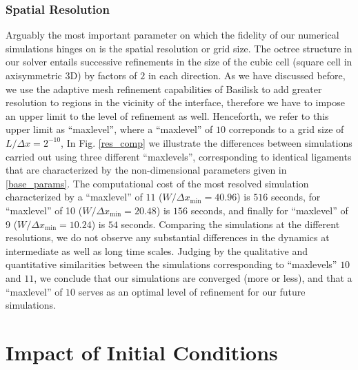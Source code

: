 \subsubsection*{Spatial Resolution}

Arguably the most important parameter on which the fidelity of our
numerical simulations hinges on is the spatial resolution or grid size. 
The octree structure in our solver entails successive refinements in the  
size of the cubic cell (square cell in axisymmetric 3D) by factors of $2$ in each direction.
As we have discussed before, we use the adaptive mesh refinement capabilities 
of Basilisk to add greater resolution to regions in the vicinity of the interface, 
therefore we have to impose an upper limit to the level of refinement as well. 
Henceforth, we refer to this upper limit as ``maxlevel'', 
where a ``maxlevel'' of $10$ correponds to a grid size of $L/ \Delta x = 2^{-10}$,  
In Fig. \ref{res_comp} we illustrate the differences between simulations carried out
using three different ``maxlevels'', corresponding to identical ligaments that
are characterized by the non-dimensional parameters given in \eqref{base_params}.
The computational cost of the most resolved simulation characterized by a ``maxlevel''
of $11$ ($W / \Delta x_{\textrm{min}} = 40.96$) is $516$ seconds, 
for ``maxlevel'' of 10 ($W / \Delta x_{\textrm{min}} = 20.48$) is $156$ seconds, and finally 
for ``maxlevel'' of 9 ($W / \Delta x_{\textrm{min}} = 10.24$) is $54$ seconds. 
Comparing the simulations at the different resolutions, we do not observe any substantial 
differences in the dynamics at intermediate as well as long time scales.
Judging by the qualitative and quantitative similarities between the simulations corresponding 
to ``maxlevels'' $10$ and $11$, we conclude that our simulations are converged (more or less),
and that a ``maxlevel'' of $10$ serves as an optimal level of refinement for our future simulations.  


\section{Impact of Initial Conditions}

